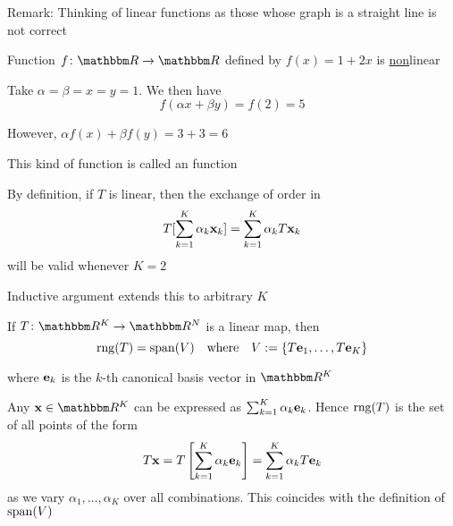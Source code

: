 \begin{frame}
    
    \vspace{2em}
    Remark: Thinking of linear functions as those whose graph is a straight
    line is not correct
    
    \vspace{.7em}
    \Eg    
    Function $f \colon \RR \to \RR$ defined by $f(x) = 1 + 2x$ is
    \underline{non}linear

    Take $\alpha = \beta = x = y = 1$. We then have
    $$f(\alpha x + \beta y) = f(2) = 5$$
    
    However, $\alpha f(x) + \beta f(y) = 3 + 3 = 6$
   
    \vspace{.7em}
    
    This kind of function is called an  function

\end{frame}

\begin{frame}

    \vspace{2em}
    By definition, if $T$ is linear, then the exchange of order in 
    \[T [ \sum_{k=1}^K \alpha_k {\mathbf x}_k ]
    = \sum_{k=1}^K \alpha_k T {\mathbf x}_k\]
    will be valid whenever $K=2$
    
    \vspace{.7em}
    Inductive argument extends this to arbitrary $K$
    
\end{frame}

\begin{frame}

    \vspace{2em}
    \Fact{\eqref{ET-fa:res}}
    If $T \colon \RR^K \to \RR^N$ is a linear map, then 
    \begin{equation*}
        \operatorname{rng}(T) = \operatorname{span}(V) 
        \quad \text{where} \quad
        V := \{T{\mathbf e}_1, \ldots, T{\mathbf e}_K\}
    \end{equation*}


    where ${\mathbf e}_k$ is the $k$-th canonical basis vector in $\RR^K$
    \vspace{1em}

    \Prf Any $\boldx \in \RR^K$ can be expressed as $\sum_{k=1}^K \alpha_k {\mathbf e}_k$. 
    Hence $\operatorname{rng}(T)$ is the set of all points of the form
    \begin{equation*}
        T{\mathbf x}
        = T \left[ \sum_{k=1}^K \alpha_k {\mathbf e}_k \right]
        = \sum_{k=1}^K \alpha_k T {\mathbf e}_k 
    \end{equation*}
    as we vary $\alpha_1, \ldots, \alpha_K$ over all combinations.
    This coincides with the definition of $\operatorname{span}(V)$

\end{frame}


